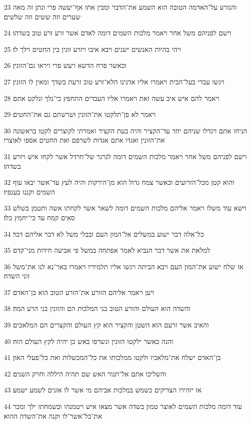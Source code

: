 \par 23 והנזרע על־האדמה הטובה הוא השמע את־הדבר ומבין אתו אף־יעשה פרי ונתן זה מאה שערים וזה ששים וזה שלשים׃
\par 24 וישם לפניהם משל אחר ויאמר מלכות השמים דומה לאדם אשר זרע זרע טוב בשדהו׃
\par 25 ויהי בהיות האנשים ישנים ויבא איבו ויזרע זונין בין החטים וילך לו׃
\par 26 וכאשר פרח הדשא ויעש פרי ויראו גם־הזונין׃
\par 27 ויגשו עבדי בעל־הבית ויאמרו אליו אדנינו הלא־זרע טוב זרעת בשדך ומאין לו הזונין׃
\par 28 ויאמר להם איש איב עשה זאת ויאמרו אליו העבדים התחפץ כי־נלך ונלקט אתם׃
\par 29 ויאמר לא פן־תלקטו את־הזונין ושרשתם גם את־החטים׃
\par 30 הניחו אתם ויגדלו שניהם יחד עד־הקציר והיה בעת הקציר ואמרתי לקוצרים לקטו בראשונה את־הזונין ואגדו אתם אגדות לשרפם ואת החטים אספו לאוצרי׃
\par 31 וישם לפניהם משל אחר ויאמר מלכות השמים דומה לגרגר של־חרדל אשר לקחו איש ויזרע בשדהו׃
\par 32 והוא קטן מכל־הזרועים וכאשר צמח גדול הוא מן־הירקות והיה לעץ עד־אשר יבאו עוף השמים וקננו בענפיו׃
\par 33 וישא עוד משלו ויאמר אליהם מלכות השמים דומה לשאר אשר לקחתו אשה ותטמן בשלש סאים קמח עד כי־יחמץ כלו׃
\par 34 כל־אלה דבר ישוע במשלים אל־המון העם ובבלי משל לא דבר אליהם דבר׃
\par 35 למלאת את אשר דבר הנביא לאמר אפתחה במשל פי אביעה חידות מני־קדם׃
\par 36 אז שלח ישוע את־המון העם ויבא הביתה ויגשו אליו תלמידיו ויאמרו באר־נא לנו את־משל זוני השדה׃
\par 37 ויען ויאמר אליהם הזורע את־הזרע הטוב הוא בן־האדם׃
\par 38 והשדה הוא העולם והזרע הטוב בני המלכות הם והזונין בני הרע המה׃
\par 39 והאיב אשר זרעם הוא השטן והקציר הוא קץ העולם והקצרים הם המלאכים׃
\par 40 והנה כאשר ילקטו הזונין ונשרפו באש כן יהיה לקץ העולם הזה׃
\par 41 בן־האדם ישלח את־מלאכיו ולקטו ממלכותו את כל־המכשלות ואת כל־פעלי האון׃
\par 42 והשליכו אתם אל־תנור האש שם תהיה היללה וחרק השנים׃
\par 43 אז יזהירו הצדיקים כשמש במלכות אביהם מי אשר לו אזנים לשמע ישמע׃
\par 44 עוד דומה מלכות השמים לאוצר טמון בשדה אשר מצאו איש ויטמנהו ובשמחתו ילך ומכר את־כל־אשר־לו וקנה את־השדה ההוא׃

